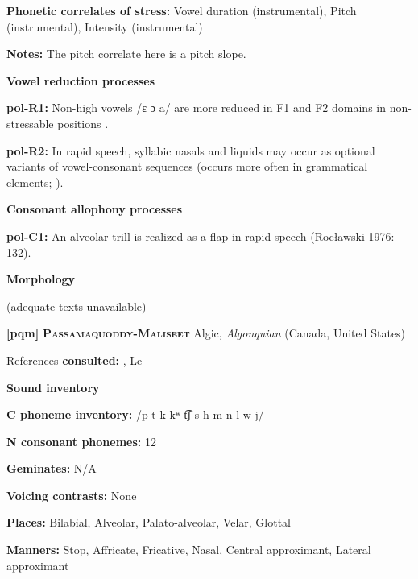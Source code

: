 \textbf{Phonetic correlates of stress:} Vowel duration (instrumental), Pitch (instrumental), Intensity (instrumental)



\textbf{Notes:} The pitch correlate here is a pitch slope.



\textbf{Vowel reduction processes}



\textbf{pol-R1:} Non-high vowels /ɛ ɔ a/ are more reduced in F1 and F2 domains in non-stressable positions \citep[378-9]{Nowak2006}.



\textbf{pol-R2:} In rapid speech, syllabic nasals and liquids may occur as optional variants of vowel-consonant sequences (occurs more often in grammatical elements; \citealt{Rubach1974}).



\textbf{Consonant allophony processes}



\textbf{pol-C1:} An alveolar trill is realized as a flap in rapid speech (Rocławski 1976: 132).



\textbf{Morphology}



(adequate texts unavailable)



\textbf{[pqm]}   \textbf{\textsc{Passamaquoddy-Maliseet}}  Algic, \textit{Algonquian} (Canada, United States)



References \textbf{consulted:} \citet{Leavitt1996}, Le\citet{Sourd1993}



\textbf{Sound inventory}



\textbf{C phoneme inventory:} /p t k kʷ t͡ʃ s h m n l w j/



\textbf{N consonant phonemes:} 12



\textbf{Geminates:} N/A



\textbf{Voicing contrasts:} None



\textbf{Places:} Bilabial, Alveolar, Palato-alveolar, Velar, Glottal



\textbf{Manners:} Stop, Affricate, Fricative, Nasal, Central approximant, Lateral approximant




